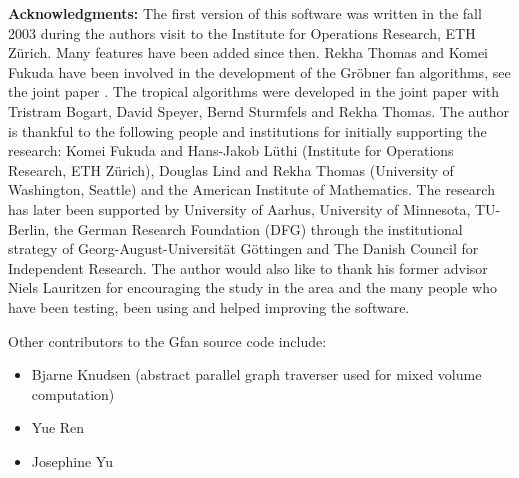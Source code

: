 \vspace{1cm}
\noindent
{\bf Acknowledgments:} The first version of this software was written
in the fall 2003 during the authors visit to the Institute for
Operations Research, ETH Z\"urich. Many features have been added since
then. Rekha Thomas and Komei Fukuda have been involved in the
development of the Gr\"obner fan algorithms, see the joint paper
\cite{fukuda}. The tropical algorithms were developed in the joint
paper \cite{ctv} with Tristram Bogart, David Speyer, Bernd Sturmfels
and Rekha Thomas. The author is thankful to the following people and
institutions for initially supporting the research: Komei Fukuda and Hans-Jakob
L\"uthi (Institute for Operations Research, ETH Z\"urich), Douglas
Lind and Rekha Thomas (University of Washington, Seattle) and the
American Institute of Mathematics. The research has
later been supported by University of Aarhus, University of Minnesota, TU-Berlin, the German Research Foundation (DFG) through the institutional strategy of Georg-August-Universit\"at G\"ottingen and The Danish Council for Independent Research. The author would also like to thank his former advisor Niels
Lauritzen for encouraging the study in the area and the many people who have been testing, been using and helped improving the software.

Other contributors to the Gfan source code include:
\begin{itemize}
\item Bjarne Knudsen (abstract parallel graph traverser used for mixed volume computation)
\item Yue Ren
\item Josephine Yu
\end{itemize}

